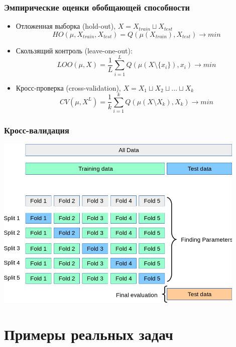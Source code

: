 \documentclass{beamer}
\begin{document}
	\begin{frame}
		\frametitle{Эмпирические оценки обобщающей способности}
		\begin{itemize}
			\item Отложенная выборка (hold-out), $X = X_{train} \sqcup X_{test}$
			$$
			HO(\mu, X_{train}, X_{test}) = Q(\mu(X_{train}), X_{test}) \to min
			$$
			
			\item Скользящий контроль (leave-one-out):
			$$
			LOO(\mu, X) = \frac{1}{L} \sum_{i=1}^{L} Q(\mu(X \setminus \{x_i\}), x_i) \to min
			$$
			
			\item Кросс-проверка (cross-validation), 
			$X = X_1 \sqcup X_2 \sqcup ... \sqcup X_k$
			$$
			CV(\mu, X^{L}) = \frac{1}{k} \sum_{i=1}^{k} Q(\mu(X \setminus X_{k}), X_{k}) \to min
			$$
		\end{itemize}
	\end{frame}
	
	
	\begin{frame}
		\frametitle{Кросс-валидация}
		
		\includegraphics[width=0.9\textwidth]{img/cv.png}
	\end{frame}
	
	\section{Примеры реальных задач}
	
\end{document}
